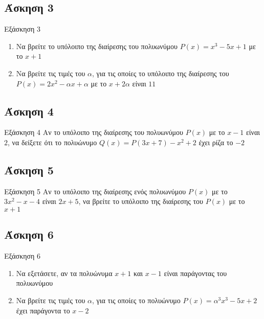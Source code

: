 \documentclass[greek]{beamer}
\begin{document}
\subsection{Άσκηση 3}
\begin{frame}[label=Άσκηση3,t]{Εξάσκηση 3}
 \begin{enumerate}
  \item<1-> Να βρείτε το υπόλοιπο της διαίρεσης του πολυωνύμου $P(x)=x^3-5x+1$ με το $x+1$
  \item<2-> Να βρείτε τις τιμές του $α$, για τις οποίες το υπόλοιπο της διαίρεσης του $P(x)=2x^2-αx+α$ με το $x+2α$ είναι $11$
 \end{enumerate}

\end{frame}

\subsection{Άσκηση 4}
\begin{frame}[label=Άσκηση4,t]{Εξάσκηση 4}
 Αν το υπόλοιπο της διαίρεσης του πολυωνύμου $P(x)$ με το $x-1$ είναι $2$, να δείξετε ότι το πολυώνυμο $Q(x)=P(3x+7)-x^2+2$ έχει ρίζα το $-2$

\end{frame}

\subsection{Άσκηση 5}
\begin{frame}[label=Άσκηση5,t]{Εξάσκηση 5}
 Αν το υπόλοιπο της διαίρεσης ενός πολυωνύμου $P(x)$ με το $3x^2-x-4$ είναι $2x+5$, να βρείτε το υπόλοιπο της διαίρεσης του $P(x)$ με το $x+1$

\end{frame}

\subsection{Άσκηση 6}
\begin{frame}[label=Άσκηση6,t]{Εξάσκηση 6}
 \begin{enumerate}
  \item<1-> Να εξετάσετε, αν τα πολυώνυμα $x+1$ και $x-1$ είναι παράγοντας του πολυωνύμου
  \item<2-> Να βρείτε τις τιμές του $α$, για τις οποίες το πολυώνυμο $P(x)=α^3x^3-5x+2$ έχει παράγοντα το $x-2$
 \end{enumerate}

\end{frame}
\end{document}

